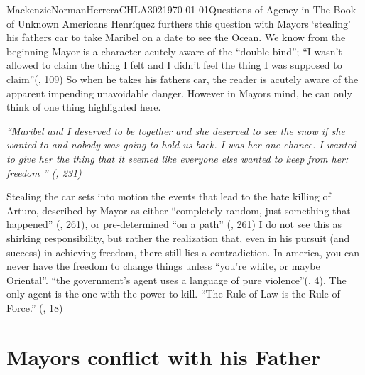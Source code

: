 \documentclass{article}
\begin{document}
\begin{mla}{Mackenzie}{Norman}{Herrera}{CHLA302}{\today}{Questions of Agency in The Book of Unknown Americans}
Henríquez furthers this question with Mayors `stealing' his fathers car to take Maribel on a date to see the Ocean. We know from the beginning Mayor is a character acutely aware of the ``double bind''; ``I wasn’t allowed to claim the thing I felt and I didn’t feel the thing I was supposed to claim''(\cite{Henriquez2014-sh}, 109)  So when he takes his fathers car, the reader is acutely aware of the apparent impending unavoidable danger. However in Mayors mind, he can only think of one thing highlighted here.

\textit{``Maribel and I deserved to be together and she deserved to see the snow if she wanted to and nobody was going to hold us back. I was her one chance. I wanted to give her the thing that it seemed like everyone else wanted to keep from her: freedom '' (\cite{Henriquez2014-sh}, 231)}

Stealing the car sets into motion the events that lead to the hate killing of Arturo, described by Mayor as either ``completely random, just something that happened'' (\cite{Henriquez2014-sh}, 261), or pre-determined ``on a path'' (\cite{Henriquez2014-sh}, 261) I do not see this as shirking responsibility, but rather the realization that, even in his pursuit (and success) in achieving freedom, there still lies a contradiction. In america, you can never have the freedom to change things unless ``you're white, or maybe Oriental''. ``the government's agent uses a language of pure violence''(\cite{wretched}, 4). The only agent is the one with the power to kill. ``The Rule of Law is the Rule of Force.'' (\cite{loves-bdy}, 18)

\section*{Mayors conflict with his Father}


\end{mla}
\end{document}
